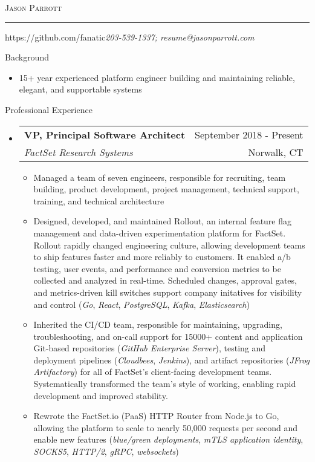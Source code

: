 \documentclass[letterpaper,10pt]{article}
\makeatletter
\newcommand{\name}{Jason Parrott}
\newcommand{\addr}{https://github.com/fanatic}
\newcommand{\phone}{203-539-1337}
\newcommand{\email}{resume@jasonparrott.com}
\newcommand{\bigname}[1]{
	\begin{center}\fontfamily{phv}\selectfont\Huge\scshape#1\end{center}
}
\newenvironment{ressection}[1]{
	\vspace{4pt}
	{\fontfamily{phv}\selectfont\Large#1}
	\begin{itemize}
	\vspace{3pt}
}{
	\end{itemize}
}
\newcommand{\ressubitem}[1]{
	\vspace{-1pt}
	\item \begin{flushleft} #1 \end{flushleft}
}
\newcommand{\resbigitem}[4]{
	\vspace{-5pt}
	\item
	\begin{tabular*}{6in}{l@{\extracolsep{\fill}}r}
		\textbf{#1} & #2 \\
		\textit{#3} & #4\\
	\end{tabular*}
}
\newenvironment{ressubsec}[4]{
	\resbigitem{#1}{#2}{#3}{#4}
	\vspace{-2pt}
	\begin{itemize}
}{
	\end{itemize}
}
\makeatother
\begin{document}
\bigname{\name}

\vspace{-8pt} \rule{\textwidth}{1pt}

\vspace{-1pt} {\small \addr \hfill \itshape\phone; \email}

\vspace{8 pt}

\begin{ressection}{Background}
	\item[]
	15+ year experienced platform engineer building and maintaining reliable, elegant, and supportable systems
\end{ressection}

\begin{ressection}{Professional Experience}
	\begin{ressubsec}{VP, Principal Software Architect}{September 2018 - Present}{FactSet Research Systems}{Norwalk, CT}
		\ressubitem{Managed a team of seven engineers, responsible for recruiting, team building, product development, project management, technical support, training, and technical architecture}
		\ressubitem{Designed, developed, and maintained Rollout, an internal feature flag management and data-driven experimentation platform for FactSet.  Rollout rapidly changed engineering culture, allowing development teams to ship features faster and more reliably to customers.  It enabled a/b testing, user events, and performance and conversion metrics to be collected and analyzed in real-time.  Scheduled changes, approval gates, and metrics-driven kill switches support company initatives for visibility and control (\textit{Go}, \textit{React}, \textit{PostgreSQL}, \textit{Kafka}, \textit{Elasticsearch})}
		\ressubitem{Inherited the CI/CD team, responsible for maintaining, upgrading, troubleshooting, and on-call support for 15000+ content and application Git-based repositories (\textit{GitHub Enterprise Server}), testing and deployment pipelines (\textit{Cloudbees}, \textit{Jenkins}), and artifact repositories (\textit{JFrog Artifactory}) for all of FactSet's client-facing development teams.  Systematically transformed the team's style of working, enabling rapid development and improved stability.}
		\ressubitem{Rewrote the FactSet.io (PaaS) HTTP Router from Node.js to Go, allowing the platform to scale to nearly 50,000 requests per second and enable new features (\textit{blue/green deployments}, \textit{mTLS application identity}, \textit{SOCKS5}, \textit{HTTP/2}, \textit{gRPC}, \textit{websockets})}

\end{ressubsec}
\end{ressection}
\end{document}
